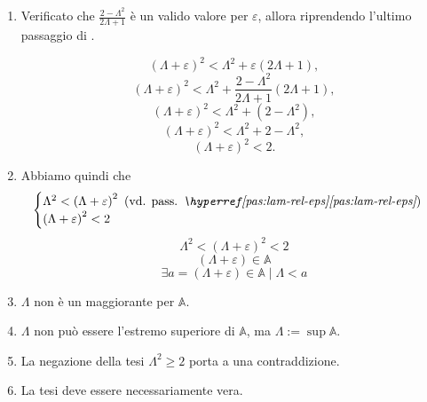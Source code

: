 \begin{enumerate}
\begin{demonstration}
\begin{enumerate}[label=(\roman*)]
\begin{enumerate}[label=\arabic*.]
\begin{enumerate}[label=\arabic{enumiii}.\arabic*.]
                    Sapendo che $\Lambda \geq 0 \Rightarrow 2\Lambda \geq 0 \Rightarrow
                    2\Lambda + 1\geq 1 \Rightarrow 2\Lambda + 1> 0$,

                    \[
                        \frac{- \Lambda^2 - 2\Lambda + 1}{2\Lambda + 1} < 0 \Leftarrow
                        - \Lambda^2 - 2\Lambda + 1 < 0 \Leftarrow
                        \Lambda^2 + 2\Lambda - 1 > 0 \Leftarrow\]\[\Leftarrow
                        \Lambda < -1-\sqrt{2}\; \lor\; \Lambda > -1+\sqrt{2}\Leftarrow
                        \Lambda > -1+\sqrt{2}\Leftarrow\]\[\Leftarrow
                        \Lambda \geq 1 \Leftarrow
                        \pasref{pas:lam-mag-zer}
                    \]
                    \qed
                \end{enumerate}

                \item Verificato che $\frac{2-\Lambda^2}{2\Lambda+1}$ è un valido valore per $\varepsilon$,
                allora riprendendo l'ultimo passaggio di  .
                
                \[
                    \left(\Lambda+\varepsilon\right)^2 < \Lambda^2 + \varepsilon\left(2\Lambda+1\right),\]\[
                    \left(\Lambda+\varepsilon\right)^2 < \Lambda^2 + \frac{2 - \Lambda^2}{2\Lambda+1}\left(2\Lambda+1\right),\]\[
                    \left(\Lambda+\varepsilon\right)^2 < \Lambda^2 + \left(2 - \Lambda^2\right),\]\[
                    \left(\Lambda+\varepsilon\right)^2 < \Lambda^2 + 2 - \Lambda^2,\]\[
                    \left(\Lambda+\varepsilon\right)^2 < 2. \]\[
                \]

                \item Abbiamo quindi che
                \[
                    \begin{cases}
                        \Lambda^2 < \left(\Lambda+\varepsilon\right)^2 \text{ (vd. pass. \pasref{pas:lam-rel-eps})}\\ 
                        \left(\Lambda+\varepsilon\right)^2 < 2
                    \end{cases} \]\[
                    \Lambda^2 < \left(\Lambda+\varepsilon\right)^2 < 2 \]\[
                    \left(\Lambda+\varepsilon\right)\in\mathbb{A}\]\[
                    \exists a=\left(\Lambda+\varepsilon\right) \in\mathbb{A} \mid \Lambda < a
                \]

                \item $\Lambda$ non è un maggiorante per $\mathbb{A}$.
                \item $\Lambda$ non può essere l'estremo superiore di $\mathbb{A}$, ma $\Lambda:=\sup\mathbb{A}$.
                \item La negazione della tesi $\Lambda^2 \geq 2$ porta a una contraddizione.
                \item La tesi deve essere necessariamente vera.



\end{enumerate}
\end{enumerate}
\end{demonstration}
\end{enumerate}
